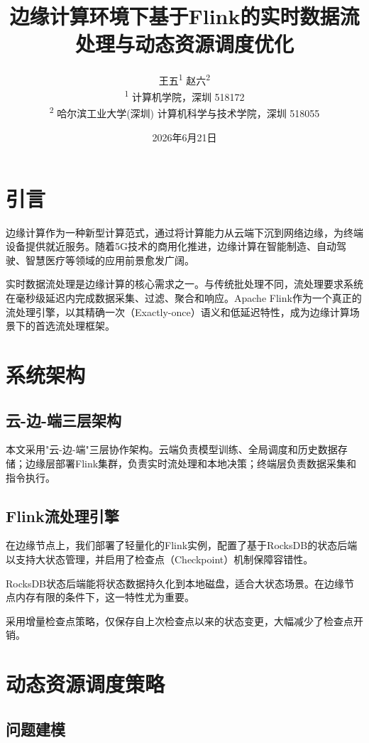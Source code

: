 \documentclass[twocolumn]{harryopo-paper}
\title{边缘计算环境下基于Flink的实时数据流处理与动态资源调度优化}
\author{王五\textsuperscript{1} \quad 赵六\textsuperscript{2}\\%
       {\small\textsuperscript{1} 计算机学院，深圳 518172}\\
       {\small\textsuperscript{2} 哈尔滨工业大学(深圳) 计算机科学与技术学院，深圳 518055}}
\date{2026年6月21日}
\begin{document}
\maketitlewithabstract

\section{引言}

边缘计算作为一种新型计算范式，通过将计算能力从云端下沉到网络边缘，为终端设备提供就近服务\cite{edge}。随着5G技术的商用化推进，边缘计算在智能制造、自动驾驶、智慧医疗等领域的应用前景愈发广阔。

实时数据流处理是边缘计算的核心需求之一。与传统批处理不同，流处理要求系统在毫秒级延迟内完成数据采集、过滤、聚合和响应。Apache Flink\cite{flink}作为一个真正的流处理引擎，以其精确一次（Exactly-once）语义和低延迟特性，成为边缘计算场景下的首选流处理框架。

\section{系统架构}

\subsection{云-边-端三层架构}

本文采用"云-边-端"三层协作架构。云端负责模型训练、全局调度和历史数据存储；边缘层部署Flink集群，负责实时流处理和本地决策；终端层负责数据采集和指令执行。

\subsection{Flink流处理引擎}

在边缘节点上，我们部署了轻量化的Flink实例，配置了基于RocksDB的状态后端以支持大状态管理，并启用了检查点（Checkpoint）机制保障容错性。

RocksDB状态后端能将状态数据持久化到本地磁盘，适合大状态场景。在边缘节点内存有限的条件下，这一特性尤为重要。

采用增量检查点策略，仅保存自上次检查点以来的状态变更，大幅减少了检查点开销。

\section{动态资源调度策略}

\subsection{问题建模}
\end{document}
